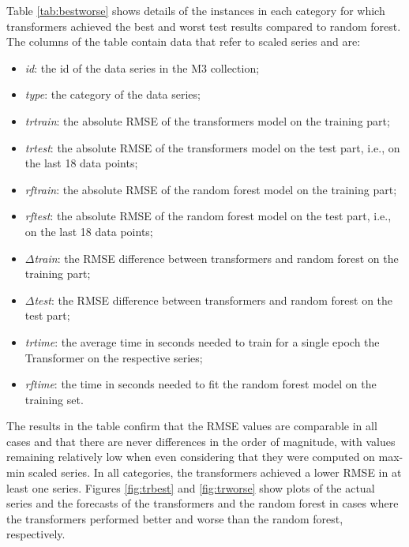 \documentclass[algorithms,article,submit,pdftex,moreauthors]{Definitions/mdpi}
\begin{document}
Table \ref{tab:bestworse} shows details of the instances in each category for which transformers achieved the best and worst test results compared to random forest. The columns of the table contain data that refer to scaled series and are:
\begin{itemize}
	\item {\it id}: the id of the data series in the M3 collection;
	\item {\it type}: the category of the data series;
	\item {\it trtrain}: the absolute RMSE of the transformers model on the training part;
	\item {\it trtest}: the absolute RMSE of the transformers model on the test part, i.e., on the last 18 data points;
	\item {\it rftrain}: the absolute RMSE of the random forest model on the training part;
	\item {\it rftest}: the absolute RMSE of the random forest model on the test part, i.e., on the last 18 data points;
	\item {\it $\Delta$train}: the RMSE difference between transformers and random forest on the training part;
	\item {\it $\Delta$test}: the RMSE difference between transformers and random forest on the test part;
	\item {\it trtime}: the average time in seconds needed to train for a single epoch the Transformer on the respective series;
	\item {\it rftime}: the time in seconds needed to fit the random forest model on the training set.
\end{itemize}

The results in the table confirm that the RMSE values are comparable in all cases and that there are never differences in the order of magnitude, with values remaining relatively low when even considering that they were computed on max-min scaled series. In all categories, the transformers achieved a lower RMSE in at least one series. Figures \ref{fig:trbest} and \ref{fig:trworse} show plots of the actual series and the forecasts of the transformers and the random forest in cases where the transformers performed better and worse than the random forest, respectively.
\end{document}
